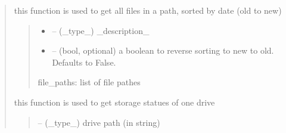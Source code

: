 \documentclass[letterpaper,10pt,english]{sphinxmanual}
\begin{document}
\begin{quote}

\begin{savenotes}\begin{fulllineitems}
\label{\detokenize{setting/backend/storage_funcs:oxin.backend.storage_funcs.get_files_in_path}}
\pysigstartsignatures
{}
\pysigstopsignatures
\sphinxAtStartPar
this function is used to get all files in a path, sorted by date (old to new)
\begin{quote}\begin{description}
\begin{itemize}
\item {} 
\sphinxAtStartPar
{} – (\_type\_) \_description\_

\item {} 
\sphinxAtStartPar
{} – (bool, optional) a boolean to reverse sorting to new to old. Defaults to False.

\end{itemize}

\sphinxAtStartPar
file\_paths: list of file pathes

\end{description}\end{quote}

\end{fulllineitems}\end{savenotes}


\begin{savenotes}\begin{fulllineitems}
\label{\detokenize{setting/backend/storage_funcs:oxin.backend.storage_funcs.get_storage_status}}
\pysigstartsignatures
{}
\pysigstopsignatures
\sphinxAtStartPar
this function is used to get storage statues of one drive
\begin{quote}\begin{description}
\sphinxAtStartPar
{} – (\_type\_) drive path (in string)


\end{description}
\end{quote}
\end{fulllineitems}
\end{savenotes}
\end{quote}
\end{document}
